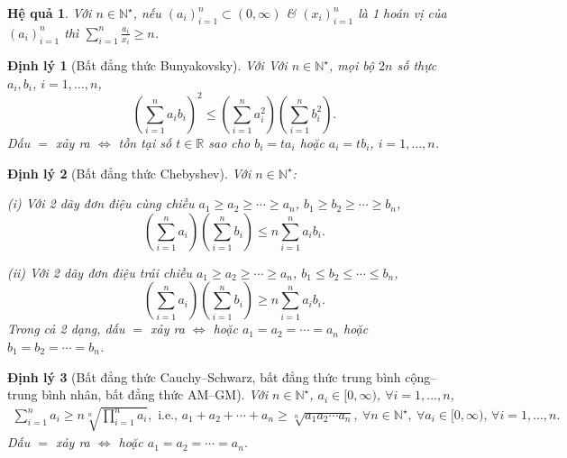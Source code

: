 \documentclass{article}
\newtheorem{dinhly}{Định lý}
\newtheorem{hequa}{Hệ quả}
\begin{document}
\begin{hequa}
	Với $n\in\mathbb{N}^\star$, nếu $(a_i)_{i=1}^n\subset(0,\infty)$ \& $(x_i)_{i=1}^n$ là 1 hoán vị của $(a_i)_{i=1}^n$ thì $\sum_{i=1}^n \frac{a_i}{x_i}\ge n$.
\end{hequa}

\begin{dinhly}[Bất đẳng thức Bunyakovsky]
	Với Với $n\in\mathbb{N}^\star$, mọi bộ $2n$ số thực $a_i,b_i$, $i = 1,\ldots,n$,
	\begin{equation}
		\label{Bunyakovsky inequality}
		\tag{B}
		\left(\sum_{i=1}^n a_ib_i\right)^2\le\left(\sum_{i=1}^n a_i^2\right)\left(\sum_{i=1}^n b_i^2\right).
	\end{equation}
	Dấu $=$ xảy ra $\Leftrightarrow$ tồn tại số $t\in\mathbb{R}$ sao cho $b_i = ta_i$ hoặc $a_i = tb_i$, $i = 1,\ldots,n$.
\end{dinhly}

\begin{dinhly}[Bất đẳng thức Chebyshev]
	Với $n\in\mathbb{N}^\star$:
	\item(i) Với 2 dãy đơn điệu cùng chiều $a_1\ge a_2\ge\cdots\ge a_n$, $b_1\ge b_2\ge\cdots\ge b_n$,
	\begin{equation}
		\label{Chebyshev inequality 1}
		\tag{Ch1}
		\left(\sum_{i=1}^n a_i\right)\left(\sum_{i=1}^n b_i\right)\le n\sum_{i=1}^n a_ib_i.
	\end{equation}
	\item(ii) Với 2 dãy đơn điệu trái chiều $a_1\ge a_2\ge\cdots\ge a_n$, $b_1\le b_2\le\cdots\le b_n$,
	\begin{equation}
		\label{Chebyshev inequality 2}
		\tag{Ch2}
		\left(\sum_{i=1}^n a_i\right)\left(\sum_{i=1}^n b_i\right)\ge n\sum_{i=1}^n a_ib_i.
	\end{equation}
	Trong cả 2 dạng, dấu $=$ xảy ra $\Leftrightarrow$ hoặc $a_1 = a_2 = \cdots = a_n$ hoặc $b_1 = b_2 = \cdots = b_n$.
\end{dinhly}

\begin{dinhly}[Bất đẳng thức Cauchy--Schwarz, bất đẳng thức trung bình cộng--trung bình nhân, bất đẳng thức AM--GM]
	Với $n\in\mathbb{N}^\star$, $a_i\in[0,\infty)$, $\forall i = 1,\ldots,n$,
	\begin{align*}
		\sum_{i=1}^n a_i\ge n\sqrt[n]{\prod_{i=1}^n a_i},\mbox{ i.e., } a_1 + a_2 + \cdots + a_n\ge\sqrt[n]{a_1a_2\cdots a_n},\ \forall n\in\mathbb{N}^\star,\ \forall a_i\in[0,\infty),\,\forall i = 1,\ldots,n.
	\end{align*}
	Dấu $=$ xảy ra $\Leftrightarrow$ hoặc $a_1 = a_2 = \cdots = a_n$.
\end{dinhly}
\end{document}

